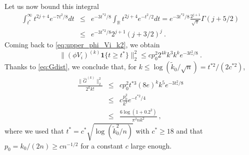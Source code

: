 \documentclass[twoside,11pt]{article}
\def\beqn{\begin{eqnarray*}}
\def\eeqn{\end{eqnarray*}}
\newcommand{\<}{\langle}
\renewcommand{\>}{\rangle}
\begin{document}
Let us now bound this integral
\beqn 
\int_{t^*}^{\infty }t^{2j+4 } e^{-7t^2/8}dt&\leq& e^{-3t^{*2}/8}\int_{\mathbb{R}}t^{2j+4 } e^{-t^2/2}dt =e^{-3t^{*2}/8} \frac{2^{j+1}}{\sqrt{\pi}}\Gamma(j+5/2)\\ 
&\leq&  e^{-3t^{*2}/8} 2^{j+1}(j+3/2)^{j}  \ .
\eeqn 
 Coming back to \eqref{eq:upper_phi_Vi_k2}, we obtain
\[
\|(\phi  V_i)^{(k)} \mathbf 1\{t \geq t^*\}\|_2^2 
\leq cp_0^2 2^{4k} k^{3} k^{k}e^{-3t^2_*/8}  \ . 
\]
Thanks to \eqref{eq:Gdist}, we conclude that, for $k\leq \log(\tilde{k}_0/\sqrt{n})= t^{*2}/(2c^{*2})$,
\begin{eqnarray}  \nonumber
\frac{\|\widehat{G}^{(k)}\|_2^2}{2^k k!} &\leq& cp_0^2 t^{*3} (8e)^k k^{5} e^{-3t^2_*/8}\\
&\leq &  c\frac{p_0^2}{k^2}  e^{-t^{*2}/4} \nonumber \\
&\leq &  \frac{6\log(1+0.2^2)}{\pi^2 nk^2} \ , 
\label{eq:upper_phi_Vi_k_petit}
\end{eqnarray}
where we used that $t^*=c^*\sqrt{\log(\tilde{k}^2_0/n)}$ with $c^*\geq 18$ and that $p_0= k_0/(2n)\geq c n^{-1/2}$ for a constant $c$ large enough. 
\end{document}
